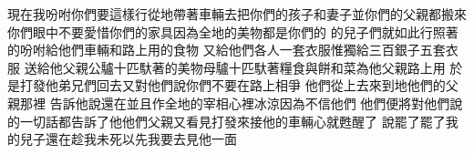 現在我吩咐你們要這樣行\chientien 從地帶著車輛去\chientien 把你們的孩子\chientien 和妻子\chientien 並你們的父親都搬來\chuan 
{}你們眼中不要愛惜你們的家具\chientien 因為全地的美物\chientien 都是你們的\chuan\Chuan
{}的兒子們就如此行\chientien{}照著的吩咐給他們車輛\chientien 和路上用的食物\chuan 
{}又給他們各人一套衣服\chientien 惟獨給三百銀子\chientien 五套衣服\yuentien 
{}送給他父親公驢十匹\chientien 馱著的美物\chientien 母驢十匹\chientien 馱著糧食與餅\chientien 和菜\chientien 為他父親路上用\chuan 
{}於是打發他弟兄們回去\chientien 又對他們說\chientien 你們不要在路上相爭\chuan 
{}他們從上去\chientien 來到地\chientien 他們的父親那裡\yuentien 
{}告訴他說\chientien{}還在\chientien 並且作全地的宰相\yuentien {}心裡冰涼\chientien 因為不信他們\chuan 
{}他們便將對他們說的一切話\chientien 都告訴了他\yuentien 他們父親\chientien 又看見打發來接他的車輛\chientien 心就甦醒了\chuan 
{}說\chientien 罷了\chientien 罷了\chientien 我的兒子還在\chientien 趁我未死以先\chientien 我要去見他一面\chuan 
